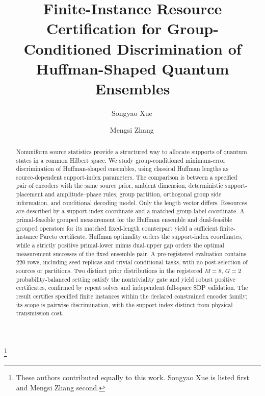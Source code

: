 \documentclass[reprint,amsmath,amssymb,aps,pra,floatfix]{revtex4-2}
\begin{document}
\title{Finite-Instance Resource Certification for Group-Conditioned Discrimination of Huffman-Shaped Quantum Ensembles}
\author{Songyao Xue\,}
\author{Mengsi Zhang\,}
\thanks{These authors contributed equally to this work. Songyao Xue is listed first and Mengsi Zhang second.}
\date{}
\begin{abstract}
Nonuniform source statistics provide a structured way to allocate supports of quantum states in a common Hilbert space. We study group-conditioned minimum-error discrimination of Huffman-shaped ensembles, using classical Huffman lengths as source-dependent support-index parameters. The comparison is between a specified pair of encoders with the same source prior, ambient dimension, deterministic support-placement and amplitude--phase rules, group partition, orthogonal group side information, and conditional decoding model. Only the length vector differs. Resources are described by a support-index coordinate and a matched group-label coordinate. A primal-feasible grouped measurement for the Huffman ensemble and dual-feasible grouped operators for its matched fixed-length counterpart yield a sufficient finite-instance Pareto certificate. Huffman optimality orders the support-index coordinates, while a strictly positive primal-lower minus dual-upper gap orders the optimal measurement successes of the fixed ensemble pair. A pre-registered evaluation contains 220 rows, including seed replicas and trivial conditional tasks, with no post-selection of sources or partitions. Two distinct prior distributions in the registered $M=8$, $G=2$ probability-balanced setting satisfy the nontriviality gate and yield robust positive certificates, confirmed by repeat solves and independent full-space SDP validation. The result certifies specified finite instances within the declared constrained encoder family; its scope is pairwise discrimination, with the support index distinct from physical transmission cost.
\end{abstract}
\maketitle
\end{document}
